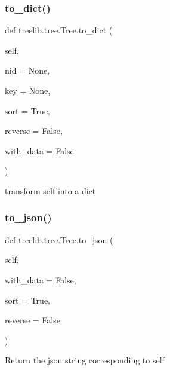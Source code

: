 \subsubsection{\texorpdfstring{to\+\_\+dict()}{to\_dict()}}
{\footnotesize\ttfamily def treelib.\+tree.\+Tree.\+to\+\_\+dict (\begin{DoxyParamCaption}\item[{}]{self,  }\item[{}]{nid = {\ttfamily None},  }\item[{}]{key = {\ttfamily None},  }\item[{}]{sort = {\ttfamily True},  }\item[{}]{reverse = {\ttfamily False},  }\item[{}]{with\+\_\+data = {\ttfamily False} }\end{DoxyParamCaption})}

\begin{DoxyVerb}transform self into a dict\end{DoxyVerb}
 \mbox{\label{classtreelib_1_1tree_1_1Tree_aa39a6f2ad477fc42c7f5339f7b67527e}} 
\subsubsection{\texorpdfstring{to\+\_\+json()}{to\_json()}}
{\footnotesize\ttfamily def treelib.\+tree.\+Tree.\+to\+\_\+json (\begin{DoxyParamCaption}\item[{}]{self,  }\item[{}]{with\+\_\+data = {\ttfamily False},  }\item[{}]{sort = {\ttfamily True},  }\item[{}]{reverse = {\ttfamily False} }\end{DoxyParamCaption})}

\begin{DoxyVerb}Return the json string corresponding to self\end{DoxyVerb}
 \mbox{\label{classtreelib_1_1tree_1_1Tree_a502b9221b106f3bda9ddc9506af40511}} 
